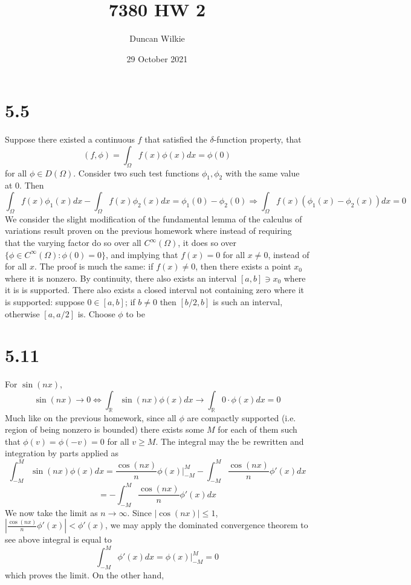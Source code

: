 \documentclass{article}
\title{7380 HW 2}
\author{Duncan Wilkie}
\date{29 October 2021}
\begin{document}
\maketitle

\section*{5.5}
Suppose there existed a continuous $f$ that satisfied the $\delta$-function property, that
\[(f,\phi)=\int_\Omega f(x)\phi(x)dx=\phi(0)\] for all $\phi\in D(\Omega)$. Consider two such test functions $\phi_1,\phi_2$ with the same value at 0. Then
\[\int_\Omega f(x)\phi_1(x)dx-\int_\Omega f(x)\phi_2(x)dx = \phi_1(0)-\phi_2(0)\Rightarrow \int_\Omega f(x)(\phi_1(x)-\phi_2(x))dx = 0\]
We consider the slight modification of the fundamental lemma of the calculus of variations result proven on the previous homework where instead of requiring that the varying factor do so over all $C^\infty(\Omega)$, it does so over $\{\phi\in C^\infty(\Omega): \phi(0)=0\}$, and implying that $f(x)=0$ for all $x\neq 0 $, instead of for all $x$. The proof is much the same: if $f(x)\neq 0$, then there exists a point $x_0$ where it is nonzero. By continuity, there also exists an interval $[a,b]\ni x_0 $ where it is is supported. There also exists a closed interval not containing zero where it is supported: suppose $0\in[a,b]$; if $b\neq 0$ then $[b/2, b]$ is such an interval, otherwise $[a, a/2]$ is. Choose $\phi$ to be
\section*{5.11}
For $\sin(nx)$,
\[\sin(nx)\to 0\Leftrightarrow\int_\mathbb{R}\sin(nx)\phi(x)dx\to \int_\mathbb{R}0\cdot\phi(x)dx=0\]
Much like on the previous homework, since all $\phi$ are compactly supported (i.e. region of being nonzero is bounded) there exists some $M$ for each of them such that $\phi(v)=\phi(-v)=0$ for all $v\geq M$. The integral may the be rewritten and integration by parts applied as
\[\int_{-M}^M\sin(nx)\phi(x)dx=\frac{\cos(nx)}{n}\phi(x)\bigg|_{-M}^M-\int_{-M}^M\frac{\cos(nx)}{n}\phi'(x)dx\]
\[=-\int_{-M}^M\frac{\cos(nx)}{n}\phi'(x)dx\]
We now take the limit as $n\to\infty$. Since $|\cos(nx)|\leq 1$, $|\frac{\cos(nx)}{n}\phi'(x)| < \phi'(x)$, we may apply the dominated convergence theorem to see above integral is equal to
\[\int_{-M}^M\phi'(x)dx=\phi(x)\bigg|_{-M}^M=0\]
which proves the limit. On the other hand,
\end{document}
